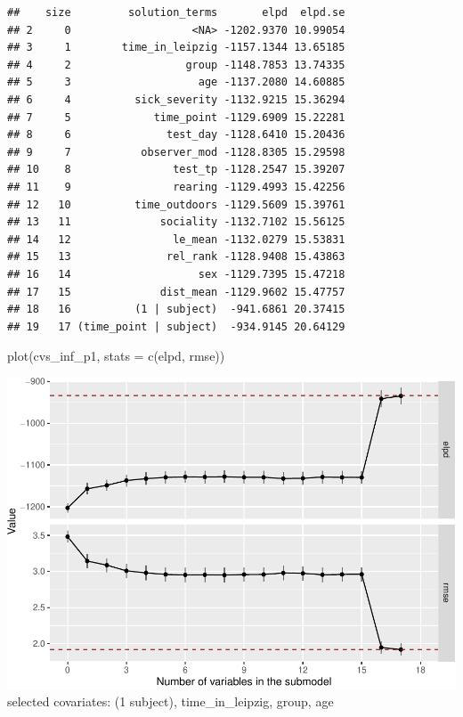 \documentclass[
]{article}
\newenvironment{Shaded}{\begin{snugshade}}{\end{snugshade}}
\newcommand{\AttributeTok}[1]{\textcolor[rgb]{0.77,0.63,0.00}{#1}}
\newcommand{\FunctionTok}[1]{\textcolor[rgb]{0.00,0.00,0.00}{#1}}
\newcommand{\NormalTok}[1]{#1}
\newcommand{\StringTok}[1]{\textcolor[rgb]{0.31,0.60,0.02}{#1}}
\begin{document}
\begin{verbatim}
##    size         solution_terms       elpd  elpd.se
## 2     0                   <NA> -1202.9370 10.99054
## 3     1        time_in_leipzig -1157.1344 13.65185
## 4     2                  group -1148.7853 13.74335
## 5     3                    age -1137.2080 14.60885
## 6     4          sick_severity -1132.9215 15.36294
## 7     5             time_point -1129.6909 15.22281
## 8     6               test_day -1128.6410 15.20436
## 9     7           observer_mod -1128.8305 15.29598
## 10    8                test_tp -1128.2547 15.39207
## 11    9                rearing -1129.4993 15.42256
## 12   10          time_outdoors -1129.5609 15.39761
## 13   11              sociality -1132.7102 15.56125
## 14   12                le_mean -1132.0279 15.53831
## 15   13               rel_rank -1128.9408 15.43863
## 16   14                    sex -1129.7395 15.47218
## 17   15              dist_mean -1129.9602 15.47757
## 18   16          (1 | subject)  -941.6861 20.37415
## 19   17 (time_point | subject)  -934.9145 20.64129
\end{verbatim}

\begin{Shaded}
\begin{Highlighting}[]
\FunctionTok{plot}\NormalTok{(cvs\_inf\_p1, }\AttributeTok{stats =} \FunctionTok{c}\NormalTok{(}\StringTok{\textquotesingle{}elpd\textquotesingle{}}\NormalTok{, }\StringTok{\textquotesingle{}rmse\textquotesingle{}}\NormalTok{))}
\end{Highlighting}
\end{Shaded}

\includegraphics{PPI_analysis_final_files/figure-latex/unnamed-chunk-14-1.pdf}
selected covariates: (1 \textbar{} subject), time\_in\_leipzig, group, age
\end{document}
